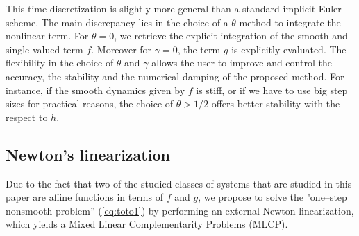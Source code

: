  This time-discretization is slightly more general than a standard implicit Euler scheme. The main discrepancy lies in the choice of a $\theta$-method to integrate the nonlinear term. For $\theta=0$, we retrieve the explicit integration of the smooth and  single valued term $f$. Moreover for $\gamma =0$, the term $g$ is explicitly evaluated. The flexibility in the choice of $\theta$ and $\gamma$ allows the user to improve and control the accuracy, the stability and the numerical damping of the proposed method. For instance, if the smooth dynamics given by $f$ is stiff, or if we have to use big step sizes for practical reasons, the choice of $\theta > 1/2$ offers better stability with the respect to $h$.


\subsection{Newton's linearization}

Due to the fact that  two of the  studied classes of systems that are studied in this paper are affine functions in terms of $f$ and $g$, we propose to solve the "one--step nonsmooth problem'' (\ref{eq:toto1}) by performing an external Newton linearization, which yields a Mixed Linear Complementarity Problems (MLCP).

